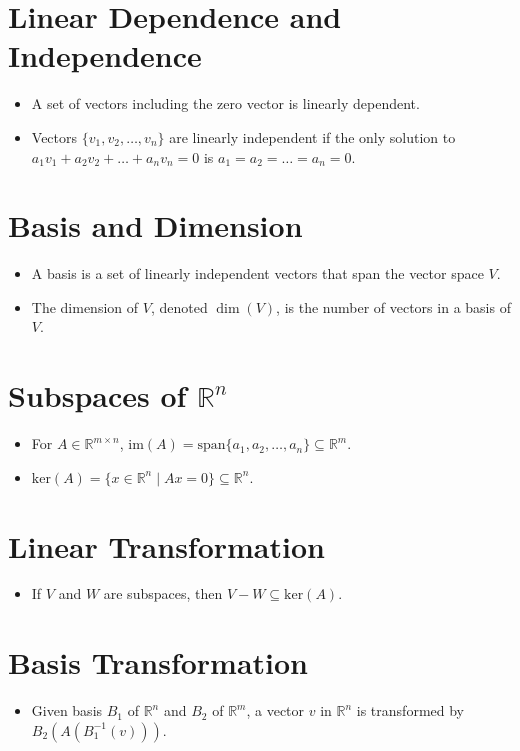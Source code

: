 \documentclass{article}
\begin{document}
\section*{Linear Dependence and Independence}
\begin{itemize}
    \item A set of vectors including the zero vector is linearly dependent.
    \item Vectors $\{v_1, v_2, \ldots, v_n\}$ are linearly independent if the only solution to $a_1v_1 + a_2v_2 + \ldots + a_nv_n = 0$ is $a_1 = a_2 = \ldots = a_n = 0$.
\end{itemize}

\section*{Basis and Dimension}
\begin{itemize}
    \item A basis is a set of linearly independent vectors that span the vector space $V$.
    \item The dimension of $V$, denoted $\dim(V)$, is the number of vectors in a basis of $V$.
\end{itemize}

\section*{Subspaces of $\mathbb{R}^n$}
\begin{itemize}
    \item For $A \in \mathbb{R}^{m \times n}$, $\text{im}(A) = \text{span}\{a_1, a_2, \ldots, a_n\} \subseteq \mathbb{R}^m$.
    \item $\text{ker}(A) = \{x \in \mathbb{R}^n \mid Ax = 0\} \subseteq \mathbb{R}^n$.
\end{itemize}

\section*{Linear Transformation}
\begin{itemize}
    \item If $V$ and $W$ are subspaces, then $V - W \subseteq \text{ker}(A)$.
\end{itemize}

\section*{Basis Transformation}
\begin{itemize}
    \item Given basis $B_1$ of $\mathbb{R}^n$ and $B_2$ of $\mathbb{R}^m$, a vector $v$ in $\mathbb{R}^n$ is transformed by $B_2(A(B_1^{-1}(v)))$.
\end{itemize}
\end{document}
